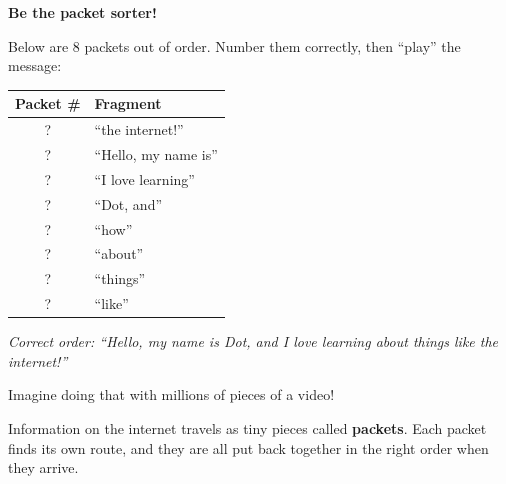 \sectionrule

\begin{tryit}
  \textbf{Be the packet sorter!}

  Below are 8 packets out of order.
  Number them correctly, then ``play'' the message:

  \begin{center}
    \begin{tabular}{|c|l|}
      \hline
      \textbf{Packet \#} & \textbf{Fragment} \\
      \hline
      ?  & ``the internet!'' \\
      ?  & ``Hello, my name is'' \\
      ?  & ``I love learning'' \\
      ?  & ``Dot, and'' \\
      ?  & ``how'' \\
      ?  & ``about'' \\
      ?  & ``things'' \\
      ?  & ``like'' \\
      \hline
    \end{tabular}
  \end{center}

  \emph{Correct order: ``Hello, my name is Dot, and I love learning about things like the internet!''}

  Imagine doing that with millions of pieces of a video!
\end{tryit}

\sectionrule

\begin{bigidea}
  Information on the internet travels as tiny pieces called \textbf{packets}.
  Each packet finds its own route, and they are all put back together
  in the right order when they arrive.
\end{bigidea}

